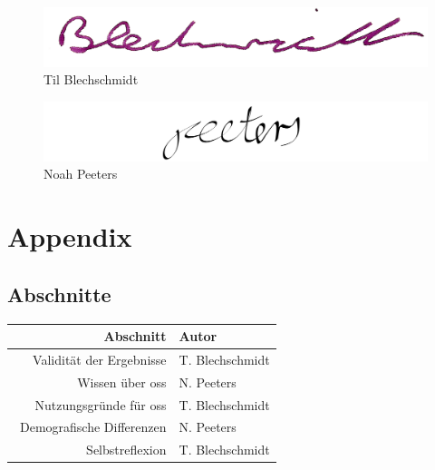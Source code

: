 \documentclass[a4paper]{article}
\begin{document}
        
        \begin{figure}[H]
            \centering
            \begin{minipage}{.5\textwidth}
                \centering
                \includegraphics[width=\textwidth]{assets/signature_tilb.png}
                Til Blechschmidt
            \end{minipage}%
            \begin{minipage}{.5\textwidth}
                \centering
                \includegraphics[width=\textwidth]{assets/signature_noahp.png}
                Noah Peeters
            \end{minipage}
        \end{figure}
        \clearpage
    
    \clearpage
    \section{Appendix}
        \printglossary[type=\acronymtype]
        \printglossary
        
        
        
        
        \clearpage
        
        \subsection{Abschnitte}
            \begin{tabular}{r | l}
              Abschnitt & Autor \\
              \hline
              Validität der Ergebnisse & T. Blechschmidt\\
              Wissen über \gls{oss} & N. Peeters\\
              Nutzungsgründe für \gls{oss} & T. Blechschmidt\\\
              Demografische Differenzen & N. Peeters\\
              Selbstreflexion & T. Blechschmidt
            \end{tabular}
        
\end{document}
